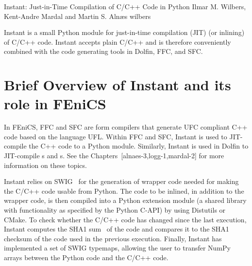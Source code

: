              {Instant: Just-in-Time Compilation of C/C++ Code in Python}
              {Ilmar M. Wilbers, Kent-Andre Mardal and Martin S. Aln{\ae}s}
              {wilbers}


Instant is a small Python module for just-in-time compilation (JIT) (or inlining) of
C/C++ code.
Instant accepts plain C/C++ and is therefore conveniently combined with the code generating tools in Dolfin, FFC, and SFC.   


\section{Brief Overview of Instant and its role in FEniCS}

In FEniCS, FFC and SFC are form compilers that generate UFC compliant C++ code based on the language UFL.  
Within FFC and SFC, Instant is used to JIT-compile the C++ code to a Python module.   
Similarly, Instant is used in Dolfin to JIT-compile s and s. 
See the Chapters~[alnaes-3,logg-1,mardal-2] for more information on these topics. 

Instant relies on SWIG~\cite{Beazleyothers2009} for the generation of wrapper
code needed for making the C/C++ code usable from
Python.  The code to be inlined, in
addition to the wrapper code, is then compiled into a Python extension
module (a shared library with functionality as specified by the Python
C-API) by using Distutils or CMake. To check whether the C/C++ code has changed
since the last execution, Instant computes the SHA1
sum~\cite{HansenWollman} of the code
and compares it to the SHA1 checksum of the code used in the previous
execution. Finally, Instant has implemented a set of
SWIG typemaps, allowing the user to transfer NumPy
arrays between the Python code and the C/C++ code.


